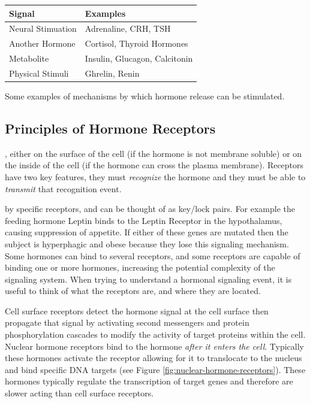\documentclass{tufte-handout}
\begin{document}
\begin{margintable}[+1cm]
  \centering
  \begin{tabular}{ll}
    \toprule
    Signal & Examples \\
    \midrule
    Neural Stimuation & Adrenaline, CRH, TSH \\
    Another Hormone & Cortisol, Thyroid Hormones \\
    Metabolite & Insulin, Glucagon, Calcitonin \\
    Physical Stimuli & Ghrelin, Renin \\
    \bottomrule
  \end{tabular}
  \caption{Some examples of mechanisms by which hormone release can be stimulated.}
  \label{tab:secreting-events}
\end{margintable}

\subsection{Principles of Hormone Receptors}

, either on the surface of the cell (if the hormone is not membrane soluble) or on the inside of the cell (if the hormone can cross the plasma membrane).  Receptors have two key features, they must \emph{recognize} the hormone and they must be able to \emph{transmit} that recognition event.

 by specific receptors, and can be thought of as key/lock pairs.  For example the feeding hormone Leptin binds to the Leptin Receptor in the hypothalamus, causing suppression of appetite.  If either of these genes are mutated then the subject is hyperphagic and obese because they lose this signaling mechanism.  Some hormones can bind to several receptors, and some receptors are capable of binding one or more hormones, increasing the potential complexity of the signaling system.  When trying to understand a hormonal signaling event, it is useful to think of what the receptors are, and where they are located.  

  Cell surface receptors detect the hormone signal at the cell surface then propagate that signal by activating second messengers and protein phosphorylation cascades to modify the activity of target proteins within the cell.  Nuclear hormone receptors bind to the hormone \emph{after it enters the cell}.  Typically these hormones activate the receptor allowing for it to translocate to the nucleus and bind specific DNA targets (see Figure \ref{fig:nuclear-hormone-receptors}).  These hormones typically regulate the transcription of target genes and therefore are slower acting than cell surface receptors.
\end{document}
